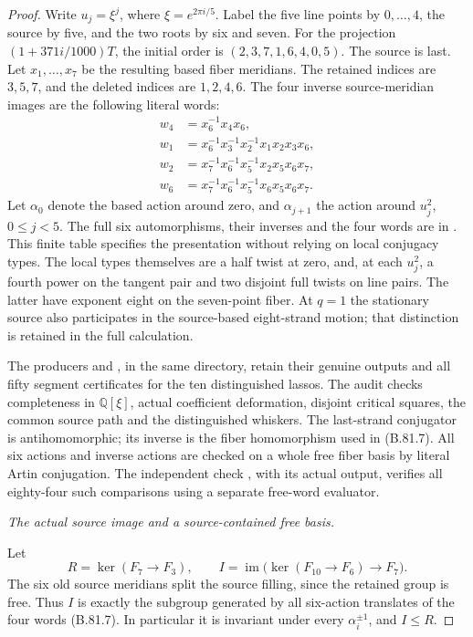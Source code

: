 \begin{proof}
Write \(u_j=\xi^j\), where \(\xi=e^{2\pi i/5}\). Label the five
line points by \(0,\ldots,4\), the source by five, and the two roots
by six and seven. For the projection \((1+371i/1000)T\), the initial
order is
\((2,3,7,1,6,4,0,5)\). The source is last. Let
\(x_1,\ldots,x_7\) be the resulting based fiber meridians.
The retained indices are \(3,5,7\), and the deleted indices are
\(1,2,4,6\). The four inverse source-meridian images are the
following literal words:
\[
\begin{split}
 w_4&=x_6^{-1}x_4x_6,\\
 w_1&=x_6^{-1}x_3^{-1}x_2^{-1}x_1x_2x_3x_6,\\
 w_2&=x_7^{-1}x_6^{-1}x_5^{-1}x_2x_5x_6x_7,\\
 w_6&=x_7^{-1}x_6^{-1}x_5^{-1}x_6x_5x_6x_7.
\end{split}
 \tag{B.81.7}
\]
Let \(\alpha_0\) denote the based action around zero, and
\(\alpha_{j+1}\) the action around \(u_j^2\), \(0\leq j<5\).
The full six automorphisms, their inverses and the four words are
in .
This finite table specifies the presentation without relying on local
conjugacy types. The local types themselves are a half twist at zero,
and, at each \(u_j^2\), a fourth power on the tangent pair and two
disjoint full twists on line pairs. The latter have exponent eight
on the seven-point fiber. At \(q=1\) the stationary source also
participates in the source-based eight-strand motion; that distinction
is retained in the full calculation.

The producers  and
, in the same directory, retain
their genuine outputs and all fifty segment certificates for the ten
distinguished lassos. The audit 
checks completeness in \(\mathbb Q[\xi]\), actual coefficient
deformation, disjoint critical squares, the common source path and
the distinguished whiskers. The last-strand conjugator is
antihomomorphic; its inverse is the fiber homomorphism used in
(B.81.7). All six actions and inverse actions are checked on a whole
free fiber basis by literal Artin conjugation. The independent check
, with its
actual output, verifies all eighty-four such comparisons using a
separate free-word evaluator.

\emph{The actual source image and a source-contained free basis.}\par
Let
\[
 R=\ker(F_7\longrightarrow F_3),\qquad
 I=\operatorname{im}\bigl(\ker(F_{10}\longrightarrow F_6)
                                      \longrightarrow F_7\bigr).
 \tag{B.81.8}
\]
The six old source meridians split the source filling, since the
retained group is free. Thus \(I\) is exactly the subgroup generated
by all six-action translates of the four words (B.81.7). In particular
it is invariant under every \(\alpha_i^{\pm1}\), and \(I\leq R\).


\end{proof}
